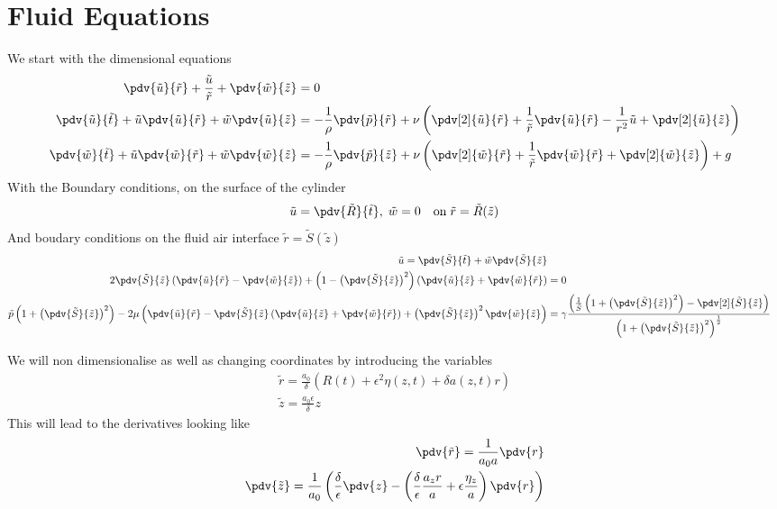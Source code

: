 \documentclass[12pt]{article}
\begin{document}
\section{Fluid Equations}
We start with the dimensional equations
\begin{align}
\pdv{\tilde u}{\tilde r}+\frac{\tilde u}{\tilde r}+\pdv{\tilde w}{\tilde z}&=0\\
\pdv{\tilde u}{\tilde t}+\tilde u\pdv{\tilde u}{\tilde r}+\tilde w\pdv{\tilde u}{\tilde z}&=-\frac{1}{\rho}\pdv{\tilde p}{\tilde r}+\nu\left(\pdv[2]{\tilde u}{\tilde r}+\frac{1}{\tilde r}\pdv{\tilde u}{\tilde r}-\frac{1}{r^2}\tilde u+\pdv[2]{\tilde u}{\tilde z}\right)\\
\pdv{\tilde w}{\tilde t}+\tilde u\pdv{\tilde w}{\tilde r}+\tilde w\pdv{\tilde w}{\tilde z}&=-\frac{1}{\rho}\pdv{\tilde p}{\tilde z}+\nu\left(\pdv[2]{\tilde w}{\tilde r}+\frac{1}{\tilde r}\pdv{\tilde w}{\tilde r}+\pdv[2]{\tilde w}{\tilde z}\right) + g 
\end{align}
With the Boundary conditions, on the surface of the cylinder
\begin{align}
\tilde u=\pdv{\tilde R}{\tilde t},\;\tilde  w=0\quad\mathrm{on}\; \tilde r=\tilde R(\tilde z) \\
\end{align}
And boudary conditions on the fluid air interface $\tilde r = \tilde S(\tilde z)$
\begin{align}
\tilde   u=\pdv{\tilde S}{\tilde t}+\tilde w\pdv{\tilde S}{\tilde z} \\
2\pdv{\tilde S}{\tilde z}\left(\pdv{\tilde u}{\tilde r}-\pdv{\tilde w}{\tilde z}\right)+\left(1-\left(\pdv{\tilde S}{\tilde z}\right)^2\right)\left(\pdv{\tilde u}{\tilde z}+\pdv{\tilde w}{\tilde r}\right)&=0\label{tangstress}\\
\tilde p\left(1+\left(\pdv{\tilde S}{\tilde z}\right)^2\right)-2\mu\left( \pdv{\tilde u}{\tilde r}-\pdv{\tilde S}{\tilde z}\left(\pdv{\tilde u}{\tilde z}+\pdv{\tilde w}{\tilde r}\right)+\left(\pdv{\tilde S}{\tilde z}\right)^2\pdv{\tilde w}{\tilde z}\right)&=\gamma\frac{\left(\frac{1}{\tilde S}\left(1+\left(\pdv{\tilde S}{\tilde z}\right)^2\right)-\pdv[2]{\tilde S}{\tilde z}\right)}{\left(1+\left(\pdv{\tilde S}{\tilde z}\right)^2\right)^{\frac{1}{2}}}\label{normstress}
\end{align}

We will non dimensionalise as well as changing coordinates by introducing the variables 
\begin{align}
\tilde r = \frac{a_0}{\delta}\left(R(t) + \epsilon^2\eta(z,t)+\delta a(z,t)r\right)\\
\tilde z = \frac{a_0\epsilon}{\delta} z
\end{align}
This will lead to the derivatives looking like
\begin{align}
\pdv{\tilde r} = \frac{1}{a_0a}\pdv{r}\\
\pdv{\tilde z} =\frac{1}{a_0}\left(\frac{\delta}{\epsilon}\pdv{z}-\left(\frac{\delta}{\epsilon}\frac{a_zr}{a}+\epsilon\frac{\eta_z}{a}\right)\pdv{r}\right)
\end{align}
\end{document}
